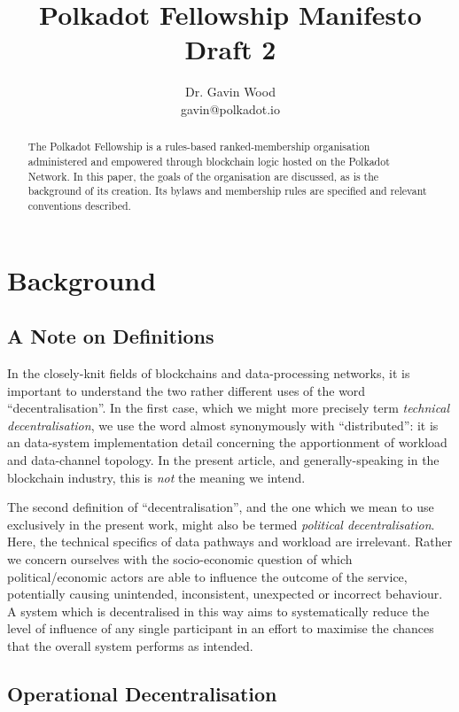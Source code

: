 \documentclass[9pt,oneside]{amsart}
\title{Polkadot Fellowship Manifesto \\ {\smaller \textbf{Draft 2}}}
\author{ Dr. Gavin Wood\\ gavin@polkadot.io}
\begin{document}
\begin{abstract}

The Polkadot Fellowship is a rules-based ranked-membership organisation administered and empowered
through blockchain logic hosted on the Polkadot Network. In this paper, the goals of the organisation are discussed, as is the background of its creation. Its bylaws and membership rules are specified and relevant conventions described.

\end{abstract}

\maketitle

\section{Background}\label{background}

\subsection{A Note on Definitions}

In the closely-knit fields of blockchains and data-processing networks, it is important to understand the two rather different uses of the word ``decentralisation''. In the first case, which we might more precisely term \emph{technical decentralisation}, we use the word almost synonymously with ``distributed'': it is an data-system implementation detail concerning the apportionment of workload and data-channel topology. In the present article, and generally-speaking in the blockchain industry, this is \emph{not} the meaning we intend.

The second definition of ``decentralisation'', and the one which we mean to use exclusively in the present work, might also be termed \emph{political decentralisation}. Here, the technical specifics of data pathways and workload are irrelevant. Rather we concern ourselves with the socio-economic question of which political/economic actors are able to influence the outcome of the service, potentially causing unintended, inconsistent, unexpected or incorrect behaviour. A system which is decentralised in this way aims to systematically reduce the level of influence of any single participant in an effort to maximise the chances that the overall system performs as intended.

\subsection{Operational Decentralisation}
\end{document}
